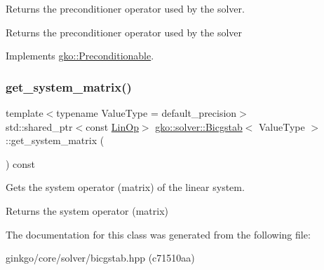 Returns the preconditioner operator used by the solver. 

\begin{DoxyReturn}{Returns}
the preconditioner operator used by the solver 
\end{DoxyReturn}


Implements \hyperlink{classgko_1_1Preconditionable_ad9545089aef0dfc83bc7a74e5bf1d748}{gko\+::\+Preconditionable}.

\mbox{\label{classgko_1_1solver_1_1Bicgstab_ada73e8ca3e8924011c8780cab92f651e}} 
\subsubsection{\texorpdfstring{get\+\_\+system\+\_\+matrix()}{get\_system\_matrix()}}
{\footnotesize\ttfamily template$<$typename Value\+Type  = default\+\_\+precision$>$ \\
std\+::shared\+\_\+ptr$<$const \hyperlink{classgko_1_1LinOp}{Lin\+Op}$>$ \hyperlink{classgko_1_1solver_1_1Bicgstab}{gko\+::solver\+::\+Bicgstab}$<$ Value\+Type $>$\+::get\+\_\+system\+\_\+matrix (\begin{DoxyParamCaption}{ }\end{DoxyParamCaption}) const\hspace{0.3cm}{\ttfamily [inline]}}



Gets the system operator (matrix) of the linear system. 

\begin{DoxyReturn}{Returns}
the system operator (matrix) 
\end{DoxyReturn}


The documentation for this class was generated from the following file\+:\begin{DoxyCompactItemize}
\item 
ginkgo/core/solver/bicgstab.\+hpp (c71510aa)\end{DoxyCompactItemize}
